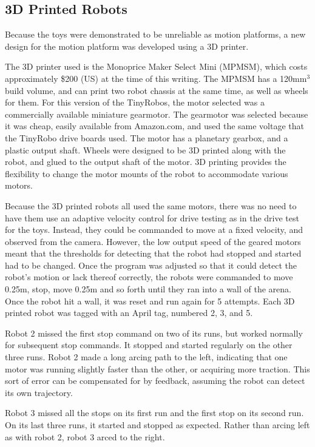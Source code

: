 \subsection{3D Printed Robots}

Because the toys were demonstrated to be unreliable as motion platforms, a new design for the motion platform was developed using a 3D printer. 

The 3D printer used is the Monoprice Maker Select Mini (MPMSM), which costs approximately \$200 (US) at the time of this writing.
The MPMSM has a 120mm$^3$ build volume, and can print two robot chassis at the same time, as well as wheels for them. 
For this version of the TinyRobos, the motor selected was a commercially available miniature gearmotor. 
The gearmotor was selected because it was cheap, easily available from Amazon.com, and used the same voltage that the TinyRobo drive boards used. 
The motor has a planetary gearbox, and a plastic output shaft. 
Wheels were designed to be 3D printed along with the robot, and glued to the output shaft of the motor. 
3D printing provides the flexibility to change the motor mounts of the robot to accommodate various motors.

Because the 3D printed robots all used the same motors, there was no need to have them use an adaptive velocity control for drive testing as in the drive test for the toys. 
Instead, they could be commanded to move at a fixed velocity, and observed from the camera. 
However, the low output speed of the geared motors meant that the thresholds for detecting that the robot had stopped and started had to be changed. 
Once the program was adjusted so that it could detect the robot's motion or lack thereof correctly, the robots were commanded to move 0.25m, stop, move 0.25m and so forth until they ran into a wall of the arena. 
Once the robot hit a wall, it was reset and run again for 5 attempts. 
Each 3D printed robot was tagged with an April tag, numbered 2, 3, and 5. 

Robot 2 missed the first stop command on two of its runs, but worked normally for subsequent stop commands. 
It stopped and started regularly on the other three runs.
Robot 2 made a long arcing path to the left, indicating that one motor was running slightly faster than the other, or acquiring more traction.
This sort of error can be compensated for by feedback, assuming the robot can detect its own trajectory. 

Robot 3 missed all the stops on its first run and the first stop on its second run.
On its last three runs, it started and stopped as expected. 
Rather than arcing left as with robot 2, robot 3 arced to the right. 

